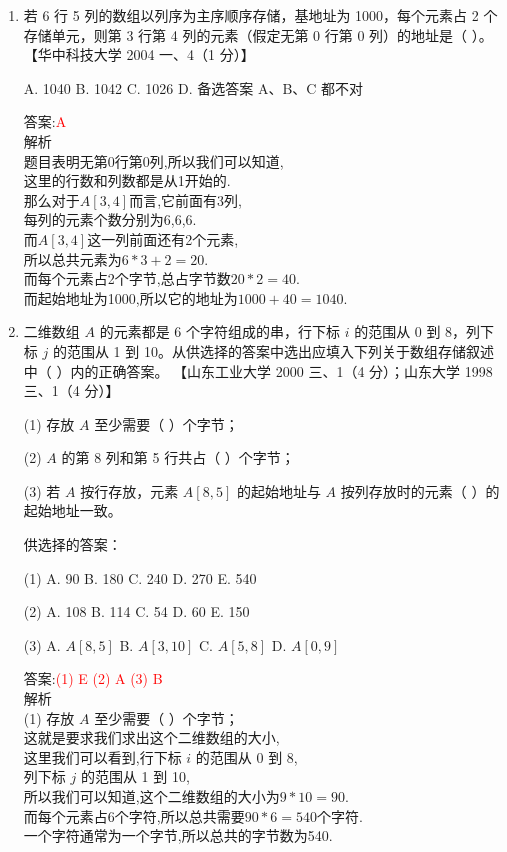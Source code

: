 \documentclass[lang=cn,newtx,10pt,scheme=chinese]{../elegantbook}
\begin{document}
\begin{enumerate}
    \item 若 6 行 5 列的数组以列序为主序顺序存储，基地址为 1000，每个元素占 2 个存储单元，则第 3 行第 4 列的元素（假定无第 0 行第 0 列）的地址是（ ）。  
    【华中科技大学 2004 一、4（1 分）】 

    A. 1040 \quad B. 1042 \quad C. 1026 \quad D. 备选答案 A、B、C 都不对  

    答案:\textcolor{red}{A}\\
    解析\\
    题目表明无第0行第0列,所以我们可以知道,\\
    这里的行数和列数都是从1开始的.\\
    那么对于$A[3,4]$而言,它前面有3列,\\
    每列的元素个数分别为6,6,6.\\
    而$A[3,4]$这一列前面还有2个元素,\\
    所以总共元素为$6*3+2=20$.\\
    而每个元素占2个字节,总占字节数$20*2=40$.\\
    而起始地址为1000,所以它的地址为$1000+40=1040$.\\

    \item 二维数组 $A$ 的元素都是 6 个字符组成的串，行下标 $i$ 的范围从 0 到 8，列下标 $j$ 的范围从 1 到 10。从供选择的答案中选出应填入下列关于数组存储叙述中（ ）内的正确答案。  
    【山东工业大学 2000 三、1（4 分）；山东大学 1998 三、1（4 分）】  

    (1) 存放 $A$ 至少需要（ ）个字节；  

    (2) $A$ 的第 8 列和第 5 行共占（ ）个字节；  

    (3) 若 $A$ 按行存放，元素 $A[8,5]$ 的起始地址与 $A$ 按列存放时的元素（ ）的起始地址一致。  

    供选择的答案：  

    (1) A. 90 \quad B. 180 \quad C. 240 \quad D. 270 \quad E. 540  

    (2) A. 108 \quad B. 114 \quad C. 54 \quad D. 60 \quad E. 150  

    (3) A. $A[8,5]$ \quad B. $A[3,10]$ \quad C. $A[5,8]$ \quad D. $A[0,9]$  

    答案:\textcolor{red}{(1) E (2) A (3) B}\\
    解析\\
    (1) 存放 $A$ 至少需要（ ）个字节；\\
    这就是要求我们求出这个二维数组的大小,\\
    这里我们可以看到,行下标 $i$ 的范围从 0 到 8,\\
    列下标 $j$ 的范围从 1 到 10,\\
    所以我们可以知道,这个二维数组的大小为$9*10=90$.\\
    而每个元素占6个字符,所以总共需要$90*6=540$个字符.\\
    一个字符通常为一个字节,所以总共的字节数为540.\\


\end{enumerate}
\end{document}
